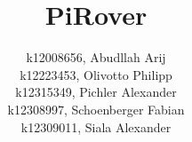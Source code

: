 \documentclass[12pt]{article}
\begin{document}
    \title{PiRover}

    \date{}
    \author{
        k12008656, Abudllah Arij\\
        k12223453, Olivotto Philipp\\
        k12315349, Pichler Alexander\\
        k12308997, Schoenberger Fabian\\
        k12309011, Siala Alexander
    }
    
    \maketitle
    \tableofcontents
    
    \newpage

    
    
    
    
    
    
    

\end{document}
